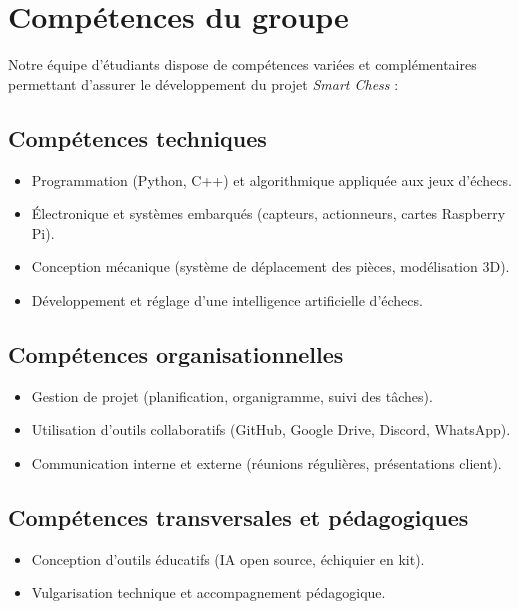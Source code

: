 \documentclass{article}
\begin{document}
\section{Compétences du groupe}

Notre équipe d’étudiants dispose de compétences variées et complémentaires permettant d’assurer le développement du projet \textit{Smart Chess} :

\subsection{Compétences techniques}
\begin{itemize}
    \item Programmation (Python, C++) et algorithmique appliquée aux jeux d’échecs.
    \item Électronique et systèmes embarqués (capteurs, actionneurs, cartes Raspberry Pi).
    \item Conception mécanique (système de déplacement des pièces, modélisation 3D).
    \item Développement et réglage d’une intelligence artificielle d’échecs.
\end{itemize}

\subsection{Compétences organisationnelles}
\begin{itemize}
    \item Gestion de projet (planification, organigramme, suivi des tâches).
    \item Utilisation d’outils collaboratifs (GitHub, Google Drive, Discord, WhatsApp).
    \item Communication interne et externe (réunions régulières, présentations client).
\end{itemize}

\subsection{Compétences transversales et pédagogiques}
\begin{itemize}
    \item Conception d’outils éducatifs (IA open source, échiquier en kit).
    \item Vulgarisation technique et accompagnement pédagogique.

\end{itemize}
\end{document}
